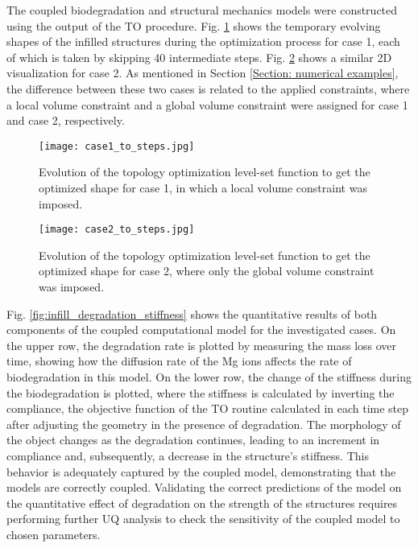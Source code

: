The coupled biodegradation and structural mechanics models were constructed using the output of the \gls{TO} procedure. Fig. \ref{fig:infill_case1_to_steps} shows the temporary evolving shapes of the infilled structures during the optimization process for case 1, each of which is taken by skipping 40 intermediate steps. Fig. \ref{fig:infill_case2_to_steps} shows a similar 2D visualization for case 2. As mentioned in Section \ref{Section: numerical examples}, the difference between these two cases is related to the applied constraints, where a local volume constraint and a global volume constraint were assigned for case 1 and case 2, respectively. 


\begin{figure}[h]
\centering
\medskip
\texttt{[image: case1\_to\_steps.jpg]}
\caption[Evolution of the topology optimization level-set function for case 1]{Evolution of the topology optimization level-set function to get the optimized shape for case 1, in which a local volume constraint was imposed.} \label{fig:infill_case1_to_steps}
\end{figure}

\begin{figure}[h]
\centering
\medskip
\texttt{[image: case2\_to\_steps.jpg]}
\caption[Evolution of the topology optimization level-set function for case 2]{Evolution of the topology optimization level-set function to get the optimized shape for case 2, where only the global volume constraint was imposed.} \label{fig:infill_case2_to_steps}
\end{figure}

Fig. \ref{fig:infill_degradation_stiffness} shows the quantitative results of both components of the coupled computational model for the investigated cases. On the upper row, the degradation rate is plotted by measuring the mass loss over time, showing how the diffusion rate of the Mg ions affects the rate of biodegradation in this model. On the lower row, the change of the stiffness during the biodegradation is plotted, where the stiffness is calculated by inverting the compliance, the objective function of the \gls{TO} routine calculated in each time step after adjusting the geometry in the presence of degradation. The morphology of the object changes as the degradation continues, leading to an increment in compliance and, subsequently, a decrease in the structure's stiffness. This behavior is adequately captured by the coupled model, demonstrating that the models are correctly coupled. Validating the correct predictions of the model on the quantitative effect of degradation on the strength of the structures requires performing further \gls{UQ} analysis to check the sensitivity of the coupled model to chosen parameters.


